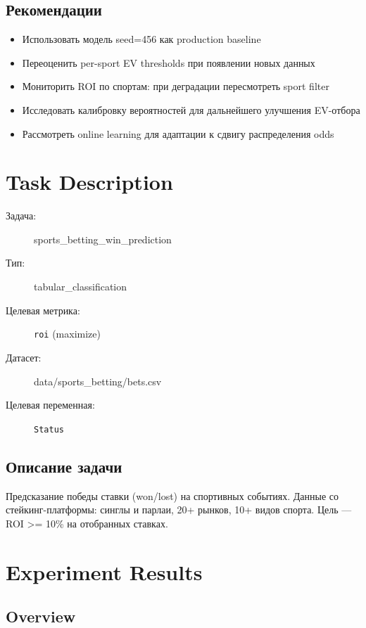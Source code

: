\documentclass[12pt,a4paper]{article}
\begin{document}
\subsection{Рекомендации}
\begin{itemize}
  \item Использовать модель seed=456 как production baseline
  \item Переоценить per-sport EV thresholds при появлении новых данных
  \item Мониторить ROI по спортам: при деградации пересмотреть sport filter
  \item Исследовать калибровку вероятностей для дальнейшего улучшения EV-отбора
  \item Рассмотреть online learning для адаптации к сдвигу распределения odds
\end{itemize}




\section{Task Description}

\begin{description}
    \item[Задача:] sports\_betting\_win\_prediction
    \item[Тип:] tabular\_classification
    \item[Целевая метрика:] \texttt{roi}
        (maximize)
    \item[Датасет:] data/sports\_betting/bets.csv
    \item[Целевая переменная:] \texttt{Status}
\end{description}

\subsection*{Описание задачи}
Предсказание победы ставки (won/lost) на спортивных событиях. Данные со стейкинг-платформы: синглы и парлаи, 20+ рынков, 10+ видов спорта. Цель — ROI >= 10\% на отобранных ставках.




\section{Experiment Results}

\subsection{Overview}
\end{document}
